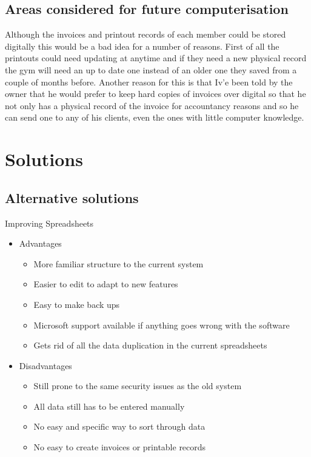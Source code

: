 \subsection{Areas considered for future computerisation}

Although the invoices and printout records of each member could be stored digitally this would be a bad idea for a number of reasons. First of all the printouts could need updating at anytime and if they need a new physical record the gym will need an up to date one instead of an older one they saved from a couple of months before. Another reason for this is that Iv'e been told by the owner that he would prefer to keep hard copies of invoices over digital so that he not only has a physical record of the invoice for accountancy reasons and so he can send one to any of his clients, even the ones with little computer knowledge.

\section{Solutions}

\subsection{Alternative solutions}

Improving Spreadsheets
\begin{itemize}
    \item Advantages
    \begin{itemize}
        \item More familiar structure to the current system
        \item Easier to edit to adapt to new features
        \item Easy to make back ups
        \item Microsoft support available if anything goes wrong with the software
        \item Gets rid of all the data duplication in the current spreadsheets
    \end{itemize}
    \item Disadvantages
    \begin{itemize}
        \item Still prone to the same security issues as the old system
        \item All data still has to be entered manually
        \item No easy and specific way to sort through data
        \item No easy to create invoices or printable records
    \end{itemize}
\end{itemize}

